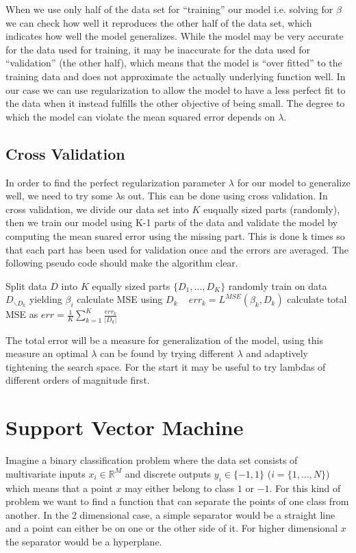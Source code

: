 \documentclass[12pt]{article}
\newcommand{\dom}[1]{\mathbb{#1}}
\begin{document}
When we use only half of the data set for \enquote{training} our model i.e. solving for $\beta$ we can check how well it reproduces the other half of the data set, which indicates how well the model generalizes.
While the model may be very accurate for the data used for training, it may be inaccurate for the data used for \enquote{validation} (the other half), which means that the model is \enquote{over fitted} to the training data and does not approximate the actually underlying function well.
In our case we can use regularization to allow the model to have a less perfect fit to the data when it instead fulfills the other objective of being small.
The degree to which the model can violate the mean squared error depends on $\lambda$.

\subsection{Cross Validation}
In order to find the perfect regularization parameter $\lambda$ for our model to generalize well, we need to try some $\lambda$s out.
This can be done using cross validation.
In cross validation, we divide our data set into $K$ euqually sized parts (randomly), then we train our model using K-1 parts of the data and validate the model by computing the mean suared error using the missing part.
This is done k times so that each part has been used for validation once and the errors are averaged.
The following pseudo code should make the algorithm clear.
\begin{algorithmic}[1]
\State Split data $D$ into $K$ equally sized parts $\{D_1,\dots,D_K\}$ randomly
\State train on data $D_{\backslash D_k}$ yielding $\beta_i$
\State calculate MSE using $D_k$ ~ $err_k = L^{MSE}(\beta_k,D_k)$
\EndFor
\State calculate total MSE as $err=\frac{1}{K}\sum_{k=1}^K \frac{err_k}{|D_k|}$ 
\end{algorithmic}
The total error will be a measure for generalization of the model, using this measure an optimal $\lambda$ can be found by trying different $\lambda$ and adaptively tightening the search space.
For the start it may be useful to try lambdas of different orders of magnitude first.


\section{Support Vector Machine}
Imagine a binary classification problem where the data set consists of multivariate inputs $x_i \in \dom{R}^M$ and discrete outputs $y_i \in \{-1,1\}$ ($i = \{1,\dots,N\}$) which means that a point $x$ may either belong to class $1$ or $-1$.
For this kind of problem we want to find a function that can separate the points of one class from another.
In the 2 dimensional case, a simple separator would be a straight line and a point can either be on one or the other side of it.
For higher dimensional $x$ the separator would be a hyperplane.
\end{document}
